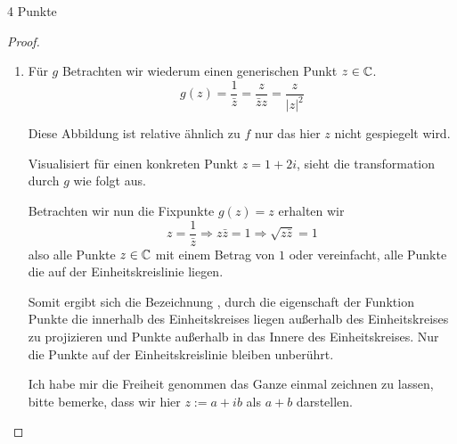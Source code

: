 \documentclass{problemset}
\begin{document}
\begin{problem}[Einheitskreis]{4 Punkte}
\begin{proof}
\begin{enumerate}
		\item Für $g$ Betrachten wir wiederum einen generischen Punkt $z \in \mathbb{C}$. \[
			      g(z) = \frac{1}{\bar{z}} = \frac{z}{\bar{z}z} = \frac{z}{{|z|}^2}
		      \]

		      Diese Abbildung ist relative ähnlich zu $f$ nur das hier $z$ nicht gespiegelt
		      wird.

		      Visualisiert für einen konkreten Punkt $z = 1 + 2i$, sieht die transformation
		      durch $g$ wie folgt aus.


		      Betrachten wir nun die Fixpunkte $g(z) = z$ erhalten wir \[
			      z = \frac{1}{\bar{z}} \Rightarrow z \bar{z} = 1 \Rightarrow \sqrt{z \bar{z}} = 1
		      \] also alle Punkte $z \in \mathbb{C}$ mit einem Betrag von $1$ oder vereinfacht,
		      alle Punkte die auf der Einheitskreislinie liegen.

		      Somit ergibt sich die Bezeichnung ,
		      durch die eigenschaft der Funktion Punkte die innerhalb des Einheitskreises
		      liegen außerhalb des Einheitskreises zu projizieren und Punkte außerhalb in das
		      Innere des Einheitskreises. Nur die Punkte auf der Einheitskreislinie bleiben
		      unberührt.

		      Ich habe mir die Freiheit genommen das Ganze einmal zeichnen zu lassen, bitte
		      bemerke, dass wir hier $z := a + ib$ als $a + b$ darstellen.


\end{enumerate}
\end{proof}
\end{problem}
\end{document}

